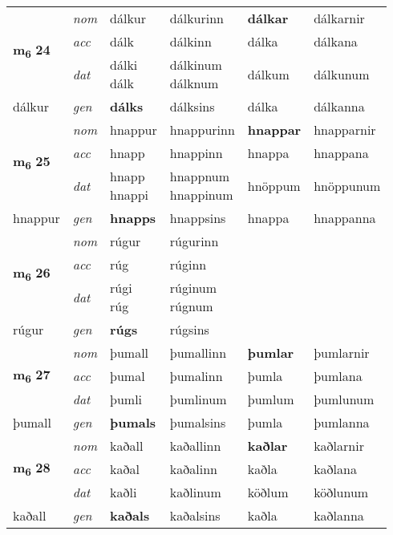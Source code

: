 \begin{longtable}[l]{X>{\footnotesize\itshape}XXXXX}
\multirow{3}{*}{{{\textbf{m{\textsubscript{6}}} \Large{\textbf{24}}}}} & nom & dálkur & dálkurinn & \textbf{dálkar} & dálkarnir \\*
 & acc & dálk & dálkinn & dálka & dálkana \\*
 & dat & \specialcell{dálki\\ dálk} & \specialcell{dálkinum\\ dálknum} & dálkum & dálkunum \\*
 {\footnotesize{dálkur}} & gen & \textbf{dálks} & dálksins & dálka & dálkanna \\
\midrule

\multirow{3}{*}{{{\textbf{m{\textsubscript{6}}} \Large{\textbf{25}}}}} & nom & hnappur & hnappurinn & \textbf{hnappar} & hnapparnir \\*
 & acc & hnapp & hnappinn & hnappa & hnappana \\*
 & dat & \specialcell{hnapp\\ hnappi} & \specialcell{hnappnum\\ hnappinum} & hnöppum & hnöppunum \\*
 {\footnotesize{hnappur}} & gen & \textbf{hnapps} & hnappsins & hnappa & hnappanna \\
\midrule

\multirow{3}{*}{{{\textbf{m{\textsubscript{6}}} \Large{\textbf{26}}}}} & nom & rúgur & rúgurinn & \textbf{} &  \\*
 & acc & rúg & rúginn &  &  \\*
 & dat & \specialcell{rúgi\\ rúg} & \specialcell{rúginum\\ rúgnum} &  &  \\*
 {\footnotesize{rúgur}} & gen & \textbf{rúgs} & rúgsins &  &  \\
\midrule

\multirow{3}{*}{{{\textbf{m{\textsubscript{6}}} \Large{\textbf{27}}}}} & nom & þumall & þumallinn & \textbf{þumlar} & þumlarnir \\*
 & acc & þumal & þumalinn & þumla & þumlana \\*
 & dat & þumli & þumlinum & þumlum & þumlunum \\*
 {\footnotesize{þumall}} & gen & \textbf{þumals} & þumalsins & þumla & þumlanna \\
\midrule

\multirow{3}{*}{{{\textbf{m{\textsubscript{6}}} \Large{\textbf{28}}}}} & nom & kaðall & kaðallinn & \textbf{kaðlar} & kaðlarnir \\*
 & acc & kaðal & kaðalinn & kaðla & kaðlana \\*
 & dat & kaðli & kaðlinum & köðlum & köðlunum \\*
 {\footnotesize{kaðall}} & gen & \textbf{kaðals} & kaðalsins & kaðla & kaðlanna \\
\midrule


\end{longtable}
